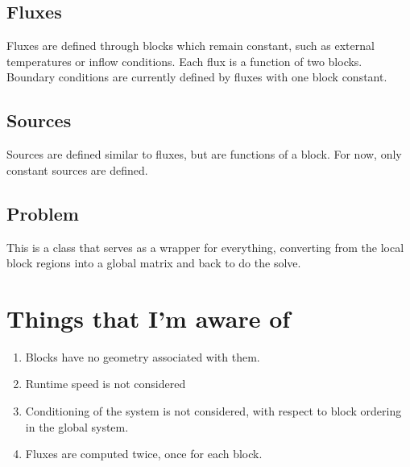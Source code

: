 \documentclass[11pt]{article}
\begin{document}
\subsection{Fluxes}
	Fluxes are defined through blocks which remain constant, such as external temperatures or inflow conditions. Each flux is a function of two blocks. Boundary conditions are currently defined by fluxes with one block constant.
\subsection{Sources}
	Sources are defined similar to fluxes, but are functions of a block. For now, only constant sources are defined.
\subsection{Problem}
This is a class that serves as a wrapper for everything, converting from the local block regions into a global matrix and back to do the solve.

\section{Things that I'm aware of}
\begin{enumerate}
\item Blocks have no geometry associated with them.
\item Runtime speed is not considered
\item Conditioning of the system is not considered, with respect to block ordering in the global system.
\item Fluxes are computed twice, once for each block.
\end{enumerate}
\end{document}
